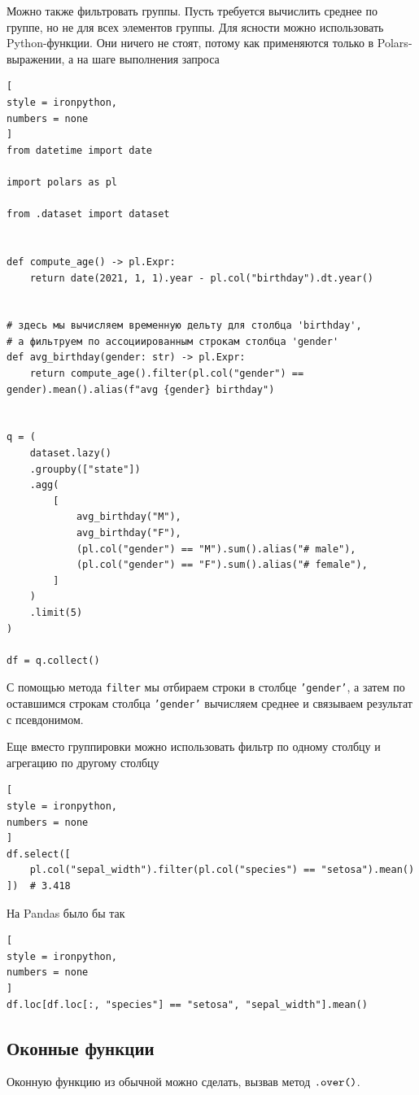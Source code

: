 \documentclass[%
	11pt,
	a4paper,
	utf8,
		]{article}
\begin{document}
Можно также фильтровать группы. Пусть требуется вычислить среднее по группе, но не для всех элементов группы. Для ясности можно использовать Python-функции. Они ничего не стоят, потому как применяются только в Polars-выражении, а на шаге выполнения запроса
\begin{lstlisting}[
style = ironpython,
numbers = none	
]
from datetime import date

import polars as pl

from .dataset import dataset


def compute_age() -> pl.Expr:
	return date(2021, 1, 1).year - pl.col("birthday").dt.year()


# здесь мы вычисляем временную дельту для столбца 'birthday',
# а фильтруем по ассоциированным строкам столбца 'gender'
def avg_birthday(gender: str) -> pl.Expr:
	return compute_age().filter(pl.col("gender") == gender).mean().alias(f"avg {gender} birthday")


q = (
	dataset.lazy()
	.groupby(["state"])
	.agg(
		[
			avg_birthday("M"),
			avg_birthday("F"),
			(pl.col("gender") == "M").sum().alias("# male"),
			(pl.col("gender") == "F").sum().alias("# female"),
		]
	)
	.limit(5)
)

df = q.collect()
\end{lstlisting}

С помощью метода \texttt{filter} мы отбираем строки в столбце \texttt{'gender'}, а затем по оставшимся строкам столбца \texttt{'gender'} вычисляем среднее и связываем результат с псевдонимом.

Еще вместо группировки можно использовать фильтр по одному столбцу и агрегацию по другому столбцу
\begin{lstlisting}[
style = ironpython,
numbers = none	
]
df.select([
    pl.col("sepal_width").filter(pl.col("species") == "setosa").mean()
])  # 3.418
\end{lstlisting}

На Pandas было бы так
\begin{lstlisting}[
style = ironpython,
numbers = none	
]
df.loc[df.loc[:, "species"] == "setosa", "sepal_width"].mean()
\end{lstlisting}

\subsection{Оконные функции}

Оконную функцию из обычной можно сделать, вызвав метод $ \verb*|.over()| $.
\end{document}
